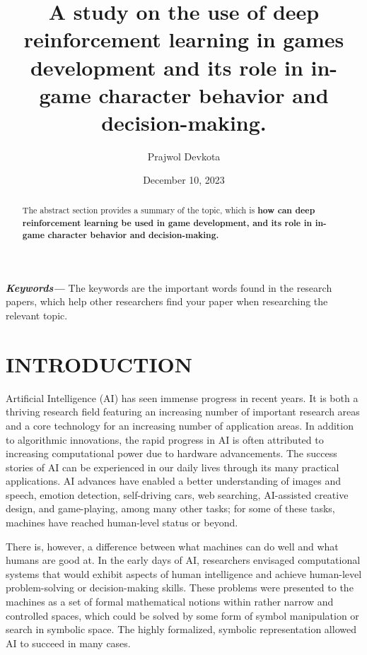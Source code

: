 \documentclass{article}
\title{A study on the use of deep reinforcement learning in games development and its role in in-game character behavior and decision-making.}
\author{Prajwol Devkota }
\date{December 10, 2023}
\providecommand{\keywords}[1] {
\small \textbf{\textit{Keywords---}} #1
}
\begin{document}
\maketitle
\begin{abstract}
The abstract section provides a summary of the topic, which is \textbf{how can deep reinforcement learning be used in game development, and its role in in-game character behavior and decision-making.} 
\end{abstract}

\keywords {The keywords are the important words found in the research papers, which help other researchers find your paper when researching the relevant topic.}
 
\section{INTRODUCTION}

Artificial Intelligence (AI) has seen immense progress in recent years. It is both a thriving research field featuring an increasing number of important research areas and a core technology for an increasing number of application areas. In addition to algorithmic innovations, the rapid progress in AI is often attributed to increasing computational power due to hardware advancements. The success stories of AI can be experienced in our daily lives through its many practical applications. AI advances have enabled a better understanding of images and speech, emotion detection, self-driving cars, web searching, AI-assisted creative design, and game-playing,
among many other tasks; for some of these tasks, machines have reached human-level status or beyond.

There is, however, a difference between what machines can do well and what humans are good at. In the early days of AI, researchers envisaged computational systems that would exhibit aspects of human intelligence and achieve human-level problem-solving or decision-making skills. These problems were presented to the machines as a set of formal mathematical notions within rather narrow and controlled spaces, which could be solved by some form of symbol manipulation or search in symbolic space. The highly formalized, symbolic representation allowed AI to succeed in many cases.
\end{document}
